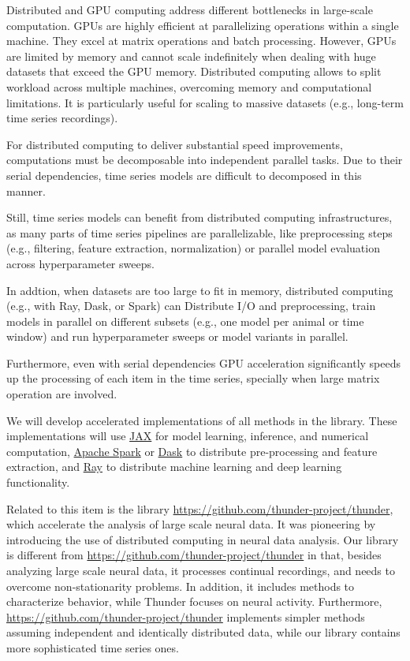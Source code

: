 Distributed and GPU computing address different bottlenecks in large-scale
computation. GPUs are highly efficient at parallelizing operations within a
single machine. They excel at matrix operations and batch processing. However,
GPUs are limited by memory and cannot scale indefinitely when dealing with huge
datasets that exceed the GPU memory.
%
Distributed computing allows to split workload across multiple machines,
overcoming memory and computational limitations. It is particularly useful for
scaling to massive datasets (e.g., long-term time series recordings).

For distributed computing to deliver substantial speed improvements,
computations must be decomposable into independent parallel tasks. Due to their
serial dependencies, time series models are difficult to decomposed in this
manner.

Still, time series models can benefit from distributed computing
infrastructures, as many parts of time series pipelines are parallelizable,
like preprocessing steps (e.g., filtering, feature extraction, normalization)
or parallel model evaluation across hyperparameter sweeps.

In addtion,  when datasets are too large to fit in memory, distributed
computing (e.g., with Ray, Dask, or Spark) can Distribute I/O and
preprocessing, train models in parallel on different subsets (e.g., one model
per animal or time window) and run hyperparameter sweeps or model variants in
parallel.

Furthermore, even with serial dependencies GPU acceleration significantly
speeds up the processing of each item in the time series, specially when large
matrix operation are involved.



We will develop accelerated implementations of all methods in the library.
These implementations will use \href{https://docs.jax.dev/}{JAX} for model
learning, inference, and numerical computation,
\href{https://spark.apache.org/}{Apache Spark} or
\href{https://www.dask.org/}{Dask} to distribute pre-processing and feature
extraction, and \href{https://docs.ray.io/}{Ray} to distribute machine learning
and deep learning functionality.

Related to this item is the library
\href{Thunder}{https://github.com/thunder-project/thunder}, which accelerate the
analysis of large scale neural data. It was pioneering by introducing the use
of distributed computing in neural data analysis.
%
Our library is different from
\href{Thunder}{https://github.com/thunder-project/thunder} in that, besides
analyzing large scale neural data, it processes continual recordings, and needs
to overcome non-stationarity problems.
%
In addition, it includes methods to characterize behavior, while Thunder
focuses on neural activity.
%
Furthermore, \href{Thunder}{https://github.com/thunder-project/thunder}
implements simpler methods assuming independent and identically distributed
data, while our library contains more sophisticated time series ones.

